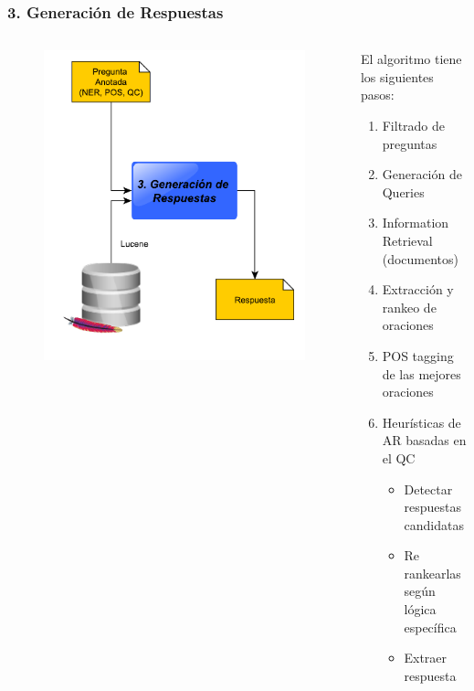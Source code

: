 \begin{frame}[<+->]
\frametitle{3. Generación de Respuestas}
  \begin{columns}[T] %
\begin{column}{.38\textwidth}
      \begin{figure}
          \includegraphics[scale=0.3]{graficos/pipeline-ar}
      \end{figure}
\end{column}%
\hfill%
\begin{column}{.58\textwidth}
El algoritmo tiene los siguientes pasos:
  \begin{enumerate}
    \item Filtrado de preguntas
    \item Generación de Queries
    \item Information Retrieval (documentos)
    \item Extracción y rankeo de oraciones
    \item POS tagging de las mejores oraciones
    \item Heurísticas de AR basadas en el QC
    \begin{itemize}
      \item \fontsize{8.5pt}{7.2}\selectfont Detectar respuestas candidatas
      \item \fontsize{8.5pt}{7.2}\selectfont Re rankearlas según lógica específica
      \item \fontsize{8.5pt}{7.2}\selectfont Extraer respuesta
    \end{itemize}
  \end{enumerate}
\end{column}%
\end{columns}
\end{frame}

